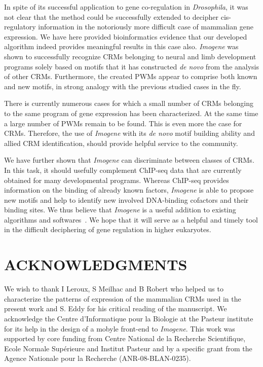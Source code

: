 \documentclass[a4,center,fleqn]{NAR}
\begin{document}
In spite of its successful application to gene co-regulation in {\em
Drosophila}, it was not clear that the method could be
successfully extended to decipher
cis-regulatory information in the notoriously more difficult case of mammalian
gene expression.
We have here provided bioinformatics evidence that our developed algorithm
indeed provides meaningful results in this case also.
{\em Imogene} was shown to successfully recognize  CRMs  belonging  to neural
and limb development programs solely based on motifs that it has constructed
{\em de novo} from the analysis of other CRMs.  Furthermore, the created PWMs
appear to comprise both known and new motifs, in strong analogy with the
previous studied cases in the fly.

There is currently numerous cases for which  a small number of CRMs belonging
to the same program of gene expression has been characterized.
At the same time a large number of PWMs remain to be found.
This is even more the case for CRMs.
Therefore,  the use of \textit{Imogene}  with its {\em de novo} motif building
ability and allied CRM identification, should provide helpful service  to the
community.

We have further shown that {\em Imogene} can discriminate between classes of
CRMs. In this task, it should usefully complement ChIP-seq data that are
currently obtained for many developmental programs.
Whereas ChIP-seq provides information on the binding of already known factors,
{\em Imogene} is able to propose new motifs and help to identify new involved
DNA-binding cofactors and their binding sites. 
We thus believe that {\em Imogene} is a useful addition to existing
algorithms and softwares~\cite{Herrmann2012uq}.
We hope that it will  serve as a helpful and timely  tool in the difficult
deciphering  of gene regulation  in higher eukaryotes.


\section{ACKNOWLEDGMENTS}

We wish to thank I Leroux, S Meilhac and B Robert who helped us to characterize
the  patterns of expression of the mammalian CRMs used in the present work and
S. Eddy for his critical reading of the manuscript.
We acknowledge the Centre d'Informatique pour la Biologie at the Pasteur
institute for its help in the design of a mobyle front-end to {\em Imogene}.
This work was supported by core funding from Centre National de la Recherche
Scientifique, Ecole Normale Sup\'erieure and  Institut Pasteur and by
a specific grant from the Agence Nationale pour la Recherche
(ANR-08-BLAN-0235).
\end{document}
